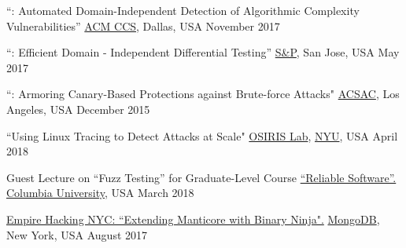
\vspace{0.025in}

\vspace{0.025in}
\begin{cvhonorswide2}
    \cvhonorwide
    {}
    {``\slowfuzz: Automated Domain-Independent Detection of Algorithmic Complexity Vulnerabilities''}
    {\href{https://ccs2017.sigsac.org/}{ACM CCS}, Dallas, USA}
    {November 2017}
\end{cvhonorswide2}

\vspace{0.025in}
\begin{cvhonorswide2}
    \cvhonorwide
    {}
    {``\nezha: Efficient Domain - Independent Differential Testing''}
    {\href{https://www.ieee-security.org/TC/SP2017/}{S\&P}, San Jose, USA}
    {May 2017}
\end{cvhonorswide2}

\vspace{0.025in}
\begin{cvhonorswide2}
  \cvhonorwide
    {}
    {``\dynaguard: Armoring Canary-Based Protections against Brute-force Attacks"}
    {\href{https://www.acsac.org/2015/}{ACSAC}, Los Angeles, USA}
    {December 2015}

\end{cvhonorswide2}


\vspace{0.025in}
\begin{cvhonorswide2}
\cvhonorwide
    {}
    {``Using Linux Tracing to Detect Attacks at Scale"}
    {\href{https://www.osiris.cyber.nyu.edu/}{OSIRIS Lab}, \href{https://engineering.nyu.edu/}{NYU}, USA}
    {April 2018}
\end{cvhonorswide2}

\vspace{0.025in}
\begin{cvhonorswide2}
\cvhonorwide
    {}
    {Guest Lecture on ``Fuzz Testing'' for Graduate-Level Course \href{http://www.cs.columbia.edu/~junfeng/18sp-e6121/syllabus.html}{``Reliable Software''.}}
    {\href{http://www.cs.columbia.edu/}{Columbia University}, USA}
    {March 2018}
\end{cvhonorswide2}

\vspace{0.025in}
\begin{cvhonorswide2}
\cvhonorwide
    {}
    {\href{https://www.meetup.com/Empire-Hacking/events/239192018}{Empire
            Hacking NYC: ``Extending Manticore with Binary Ninja".}}
    {\href{https://www.mongodb.com/}{MongoDB}, New York, USA}
    {August 2017}
\end{cvhonorswide2}

